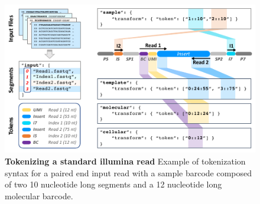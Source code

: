 \documentclass[10pt,twocolumn]{article}
\begin{document}
\begin{figure}[htbp]
\centering
\includegraphics[keepaspectratio,scale=1]{Illumina_tokenization}
\caption{\footnotesize{\textbf{Tokenizing a standard illumina read} Example of tokenization syntax for a paired end input read with a sample barcode composed of two 10 nucleotide long segments and a 12 nucleotide long molecular barcode. } }
\label{fig:16}
\end{figure}
\end{document}
